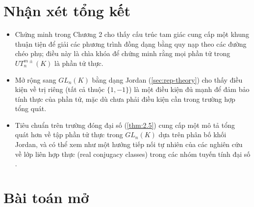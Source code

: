 \section{Nhận xét tổng kết}
\label{sec:remarks-open-problems}

\begin{itemize}
  \item Chứng minh trong Chương 2 cho thấy cấu trúc tam giác cung cấp một khung thuận tiện để giải các phương trình đồng dạng bằng quy nạp theo các đường chéo phụ; điều này là chìa khóa để chứng minh rằng mọi phần tử trong $UT_n^{m\pm}(K)$ là phần tử thực.
  \item Mở rộng sang $GL_n(K)$ bằng dạng Jordan (\cref{sec:rep-theory}) cho thấy điều kiện về trị riêng (tất cả thuộc $\{1,-1\}$) là một điều kiện đủ mạnh để đảm bảo tính thực của phần tử, mặc dù chưa phải điều kiện cần trong trường hợp tổng quát.
  \item Tiêu chuẩn trên trường đóng đại số (\cref{thm:2.5}) cung cấp một mô tả tổng quát hơn về tập phần tử thực trong $GL_n(K)$ dựa trên phân bố khối Jordan, và có thể xem như một hướng tiếp nối tự nhiên của các nghiên cứu về lớp liên hợp thực (real conjugacy classes) trong các nhóm tuyến tính đại số \cite{TiepZalesski2005,SinghThakur2008}.
\end{itemize}

\section{Bài toán mở}
\label{sec:open-problems}

